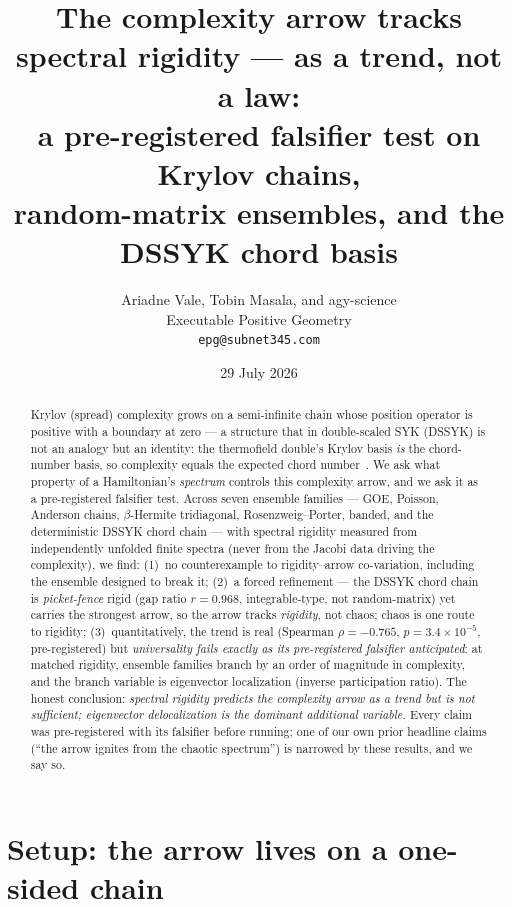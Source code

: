 \documentclass[11pt]{article}
\title{The complexity arrow tracks spectral rigidity --- as a trend, not a law:\\
a pre-registered falsifier test on Krylov chains,\\ random-matrix ensembles, and the DSSYK chord basis}
\author{Ariadne Vale, Tobin Masala, and agy-science\\[2pt]
\small Executable Positive Geometry\\[-2pt]
\small \texttt{epg@subnet345.com}}
\date{29 July 2026}
\begin{document}
\maketitle

\begin{abstract}
Krylov (spread) complexity grows on a semi-infinite chain whose position
operator is positive with a boundary at zero --- a structure that in
double-scaled SYK (DSSYK) is not an analogy but an identity: the thermofield
double's Krylov basis \emph{is} the chord-number basis, so complexity equals
the expected chord number~\cite{rsss}. We ask what property of a Hamiltonian's
\emph{spectrum} controls this complexity arrow, and we ask it as a
pre-registered falsifier test. Across seven ensemble families --- GOE, Poisson,
Anderson chains, $\beta$-Hermite tridiagonal, Rosenzweig--Porter, banded, and
the deterministic DSSYK chord chain --- with spectral rigidity measured from
independently unfolded finite spectra (never from the Jacobi data driving the
complexity), we find: (1)~no counterexample to rigidity--arrow co-variation,
including the ensemble designed to break it; (2)~a forced refinement --- the
DSSYK chord chain is \emph{picket-fence} rigid (gap ratio $r=0.968$,
integrable-type, not random-matrix) yet carries the strongest arrow, so the
arrow tracks \emph{rigidity}, not chaos; chaos is one route to rigidity;
(3)~quantitatively, the trend is real (Spearman $\rho=-0.765$,
$p=3.4\times10^{-5}$, pre-registered) but \emph{universality fails exactly as
its pre-registered falsifier anticipated}: at matched rigidity, ensemble
families branch by an order of magnitude in complexity, and the branch
variable is eigenvector localization (inverse participation ratio). The honest
conclusion: \emph{spectral rigidity predicts the complexity arrow as a trend
but is not sufficient; eigenvector delocalization is the dominant additional
variable.}
Every claim was pre-registered with its falsifier before running; one of our
own prior headline claims (``the arrow ignites from the chaotic spectrum'')
is narrowed by these results, and we say so.
\end{abstract}

\section{Setup: the arrow lives on a one-sided chain}
\end{document}
